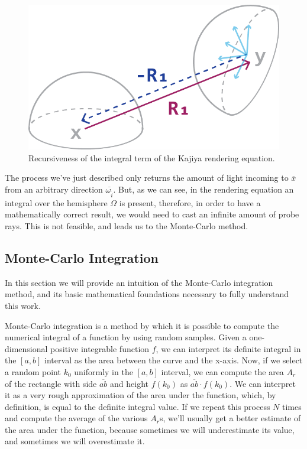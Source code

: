 \documentclass{PoliMi_MasterThesis}
\begin{document}
\begin{figure}[H]
    \centering
    \includegraphics[width=\textwidth*\real{0.5}]{Images/kajiya_recursive.png}
    \caption{Recursiveness of the integral term of the Kajiya rendering equation.}
    \label{fig:kajiya_recursiveness}
\end{figure}

The process we've just described only returns the amount of light incoming to $\overline{x}$ from an arbitrary direction $\overline{\omega_{\tilde{i}}}$. But, as we can see, in the rendering equation an integral over the hemisphere $\Omega$ is present, therefore, in order to have a mathematically correct result, we would need to cast an infinite amount of probe rays. This is not feasible, and leads us to the Monte-Carlo method.

\subsection{Monte-Carlo Integration} 
In this section we will provide an intuition of the Monte-Carlo integration method, and its basic mathematical foundations necessary to fully understand this work.

Monte-Carlo integration \cite{monte_carlo_integration} is a method by which it is possible to compute the numerical integral of a function by using random samples.
Given a one-dimensional positive integrable function $f$, we can interpret its definite integral in the $[a,b]$ interval as the area between the curve and the x-axis.
Now, if we select a random point $k_0$ uniformly in the $[a,b]$ interval, we can compute the area $A_r$ of the rectangle with side $\overline{ab}$ and height $f(k_0)$ as $\overline{ab} \cdot f(k_0)$. We can interpret it as a very rough approximation of the area under the function, which, by definition, is equal to the definite integral value. If we repeat this process $N$ times and compute the average of the various $A_r$s, we'll usually get a better estimate of the area under the function, because sometimes we will underestimate its value, and sometimes we will overestimate it.
\end{document}
